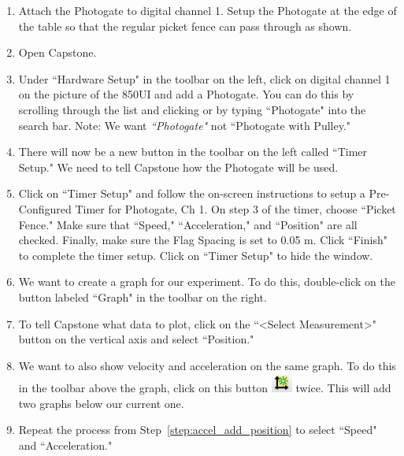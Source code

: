 \documentclass[main.tex]{subfiles}
\begin{document}
\begin{enumerate}
\item
Attach the Photogate to digital channel 1. Setup the Photogate at the edge of the table so that the regular picket fence can pass through as shown. 
\item
Open Capstone.
\item
Under ``Hardware Setup" in the toolbar on the left, click on digital channel 1 on the picture of the 850UI and add a Photogate. You can do this by scrolling through the list and clicking or by typing ``Photogate" into the search bar. Note: We want \emph{``Photogate"} not ``Photogate with Pulley."
\item
There will now be a new button in the toolbar on the left called ``Timer Setup." We need to tell Capstone how the Photogate will be used.
\item
Click on ``Timer Setup" and follow the on-screen instructions to setup a Pre-Configured Timer for Photogate, Ch 1. On step 3 of the timer, choose ``Picket Fence." Make sure that ``Speed," ``Acceleration," and ``Position" are all checked. Finally, make sure the Flag Spacing is set to 0.05 m. Click ``Finish" to complete the timer setup. Click on ``Timer Setup" to hide the window.
\item
We want to create a graph for our experiment. To do this, double-click on the button labeled ``Graph" in the toolbar on the right.
\item\label{step:accel_add_position}
To tell Capstone what data to plot, click on the ``\textless Select Measurement\textgreater" button on the vertical axis and select ``Position."
\item
We want to also show velocity and acceleration on the same graph. To do this in the toolbar above the graph, click on this button \includegraphics{Add_New_Plot} twice.
 This will add two graphs below our current one.
\item
Repeat the process from Step~\ref{step:accel_add_position} to select ``Speed" and ``Acceleration."
\end{enumerate}
\end{document}
